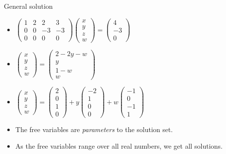 \documentclass{beamer}
\begin{document}
\begin{frame}{General solution}

\begin{itemize}
\item
$
\begin{pmatrix}
1 & 2 & 2 & 3 \\
0 & 0 & -3 & -3 \\
0 & 0 & 0 & 0
\end{pmatrix}
\begin{pmatrix}
x \\ y \\ z \\ w
\end{pmatrix}
=
\begin{pmatrix}
4 \\ -3 \\  0
\end{pmatrix}
$
\item
$
\begin{pmatrix}
x \\ y \\ z \\ w
\end{pmatrix}
=
\begin{pmatrix}
2 -2y - w \\
y \\
1-w \\
w
\end{pmatrix}
$
\item
$
\begin{pmatrix}
x \\ y \\ z \\ w
\end{pmatrix}
=
\begin{pmatrix}
2 \\
0 \\
1 \\
0
\end{pmatrix}
+
y
\begin{pmatrix}
-2 \\
1 \\
0 \\
0
\end{pmatrix}
+
w
\begin{pmatrix}
-1 \\
0 \\
-1 \\
1
\end{pmatrix}
$
\item The free variables are \emph{parameters} to the solution set.
\item As the free variables range over all real numbers, we get all solutions.
\end{itemize}
\end{frame}
\end{document}
